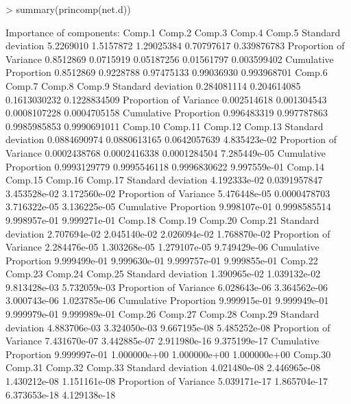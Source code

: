 \documentclass[12pt]{article}
\begin{document}
\begin{Schunk}
\begin{Sinput}
> summary(princomp(net.d))
\end{Sinput}
\begin{Soutput}
Importance of components:
                          Comp.1    Comp.2     Comp.3     Comp.4      Comp.5
Standard deviation     5.2269010 1.5157872 1.29025384 0.70797617 0.339876783
Proportion of Variance 0.8512869 0.0715919 0.05187256 0.01561797 0.003599402
Cumulative Proportion  0.8512869 0.9228788 0.97475133 0.99036930 0.993968701
                            Comp.6      Comp.7       Comp.8       Comp.9
Standard deviation     0.284081114 0.204614085 0.1613030232 0.1228834509
Proportion of Variance 0.002514618 0.001304543 0.0008107228 0.0004705158
Cumulative Proportion  0.996483319 0.997787863 0.9985985853 0.9990691011
                            Comp.10      Comp.11      Comp.12      Comp.13
Standard deviation     0.0884690974 0.0880613165 0.0642057639 4.835423e-02
Proportion of Variance 0.0002438768 0.0002416338 0.0001284504 7.285449e-05
Cumulative Proportion  0.9993129779 0.9995546118 0.9996830622 9.997559e-01
                            Comp.14      Comp.15      Comp.16      Comp.17
Standard deviation     4.192333e-02 0.0391957847 3.453528e-02 3.172560e-02
Proportion of Variance 5.476448e-05 0.0000478703 3.716322e-05 3.136225e-05
Cumulative Proportion  9.998107e-01 0.9998585514 9.998957e-01 9.999271e-01
                            Comp.18      Comp.19      Comp.20      Comp.21
Standard deviation     2.707694e-02 2.045140e-02 2.026094e-02 1.768870e-02
Proportion of Variance 2.284476e-05 1.303268e-05 1.279107e-05 9.749429e-06
Cumulative Proportion  9.999499e-01 9.999630e-01 9.999757e-01 9.999855e-01
                            Comp.22      Comp.23      Comp.24      Comp.25
Standard deviation     1.390965e-02 1.039132e-02 9.813428e-03 5.732059e-03
Proportion of Variance 6.028643e-06 3.364562e-06 3.000743e-06 1.023785e-06
Cumulative Proportion  9.999915e-01 9.999949e-01 9.999979e-01 9.999989e-01
                            Comp.26      Comp.27      Comp.28      Comp.29
Standard deviation     4.883706e-03 3.324050e-03 9.667195e-08 5.485252e-08
Proportion of Variance 7.431670e-07 3.442885e-07 2.911980e-16 9.375199e-17
Cumulative Proportion  9.999997e-01 1.000000e+00 1.000000e+00 1.000000e+00
                            Comp.30      Comp.31      Comp.32      Comp.33
Standard deviation     4.021480e-08 2.446965e-08 1.430212e-08 1.151161e-08
Proportion of Variance 5.039171e-17 1.865704e-17 6.373653e-18 4.129138e-18

\end{Soutput}
\end{Schunk}
\end{document}
